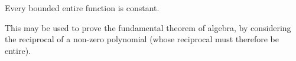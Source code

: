 Every bounded entire function is
constant.
\par
 This may be used to prove the fundamental theorem of
algebra, by considering the reciprocal of a non-zero polynomial
(whose reciprocal must therefore be entire).


